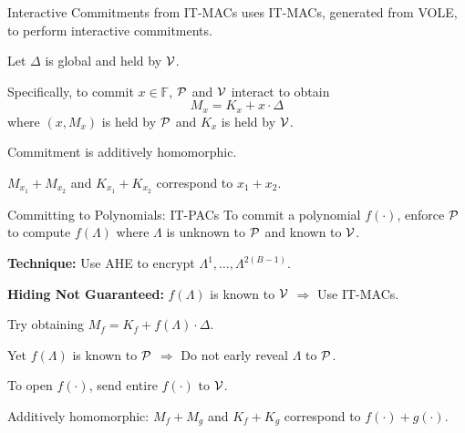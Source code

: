 \begin{frame}{Interactive Commitments from IT-MACs}
	\cite{BaumMRS21, YangSWW21, DittmerOI21} uses IT-MACs, generated from VOLE, to perform interactive commitments. 
	
	Let  $\Delta$ is global and held by $\mathcal{V}$.
	
	Specifically, to commit $x \in \mathbb{F}$,  $\mathcal{P}$ and $\mathcal{V}$ interact to obtain
	\begin{equation*}
		M_x = K_x + x\cdot \Delta
	\end{equation*}
	where $(x, M_x)$ is held by $\mathcal{P}$ and $K_x$ is held by $\mathcal{V}$.
	
	Commitment is additively homomorphic. 
	
	$M_{x_1} + M_{x_2}$ and $K_{x_1} + K_{x_2}$ correspond to $x_1 + x_2$.
\end{frame}
\begin{frame}{Committing to Polynomials: IT-PACs}
	To commit a polynomial $f(\cdot)$, enforce $\mathcal{P}$ to compute $f(\Lambda)$ where $\Lambda$ is unknown to $\mathcal{P}$ and known to $\mathcal{V}$.
	
	\textbf{Technique:} Use AHE to encrypt $\Lambda^1, \dots, \Lambda^{2(B - 1)}$.
	
	\textbf{Hiding Not Guaranteed:} $f(\Lambda)$ is known to $\mathcal{V}$ $\Rightarrow$ Use IT-MACs.
	
	Try obtaining $M_f = K_f + f(\Lambda) \cdot \Delta$.
	
	Yet $f(\Lambda)$ is known to $\mathcal{P}$ $\Rightarrow$ Do not early reveal $\Lambda$ to $\mathcal{P}$.
	
	To open $f(\cdot)$, send entire $f(\cdot)$ to $\mathcal{V}$.
	
	Additively homomorphic: $M_{f} + M_{g}$ and $K_{f} + K_{g}$ correspond to $f(\cdot) + g(\cdot)$.
\end{frame}
